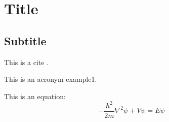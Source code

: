 \clearpage
\section{Title}
\lipsum[1-2] %
\subsection{Subtitle}
\lipsum[3-4] %

This is a cite \cite{Einstein1916}.

This is an acronym \gls{example1}.

This is an equation:
\begin{equation}
   -\frac{\hbar^2}{2m}\nabla^2\psi + V\psi = E\psi
\end{equation}